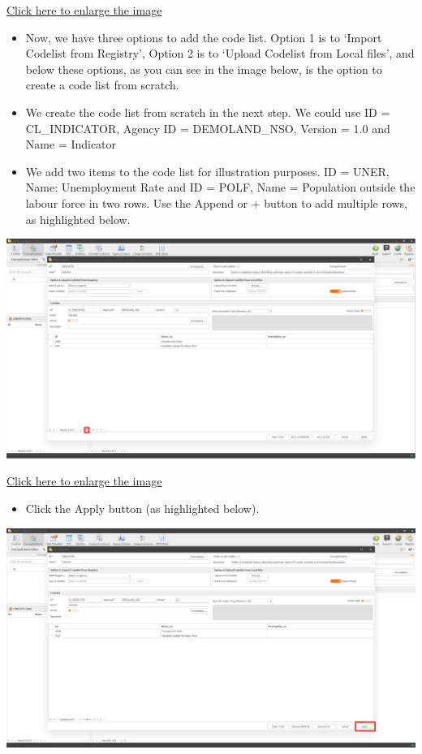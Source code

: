 \documentclass[
]{book}
\providecommand{\tightlist}{%
  \setlength{\itemsep}{0pt}\setlength{\parskip}{0pt}}
\begin{document}
\href{images/image241.png}{Click here to enlarge the image}

\begin{itemize}
\item
  Now, we have three options to add the code list. Option 1 is to `Import Codelist from Registry', Option 2 is to `Upload Codelist from Local files', and below these options, as you can see in the image below, is the option to create a code list from scratch.
\item
  We create the code list from scratch in the next step. We could use ID = CL\_INDICATOR, Agency ID = DEMOLAND\_NSO, Version = 1.0 and Name = Indicator
\item
  We add two items to the code list for illustration purposes. ID = UNER, Name: Unemployment Rate and ID = POLF, Name = Population outside the labour force in two rows. Use the Append or + button to add multiple rows, as highlighted below.
\end{itemize}

\begin{center}\includegraphics[width=1\linewidth]{./images/image242} \end{center}

\href{images/image242.png}{Click here to enlarge the image}

\begin{itemize}
\tightlist
\item
  Click the Apply button (as highlighted below).
\end{itemize}

\begin{center}\includegraphics[width=1\linewidth]{./images/image243} \end{center}
\end{document}
